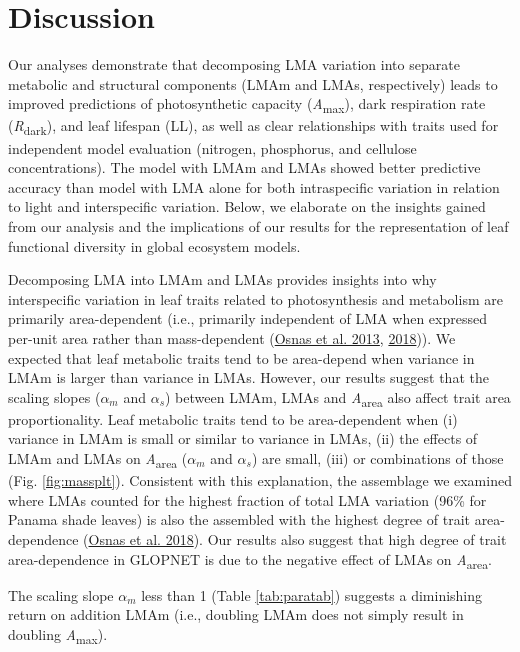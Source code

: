 \documentclass[
  12pt,
]{article}
\begin{document}
\hypertarget{discussion}{%
\section{Discussion}\label{discussion}}

Our analyses demonstrate that decomposing LMA variation into separate metabolic and structural components (LMAm and LMAs, respectively) leads to improved predictions of photosynthetic capacity (\emph{A}\textsubscript{max}), dark respiration rate (\emph{R}\textsubscript{dark}), and leaf lifespan (LL), as well as clear relationships with traits used for independent model evaluation (nitrogen, phosphorus, and cellulose concentrations).
The model with LMAm and LMAs showed better predictive accuracy than model with LMA alone for both intraspecific variation in relation to light and interspecific variation.
Below, we elaborate on the insights gained from our analysis and the implications of our results for the representation of leaf functional diversity in global ecosystem models.

Decomposing LMA into LMAm and LMAs provides insights into why interspecific variation in leaf traits related to photosynthesis and metabolism are primarily area-dependent (i.e., primarily independent of LMA when expressed per-unit area rather than mass-dependent (\protect\hyperlink{ref-Osnas2013}{Osnas et al. 2013}, \protect\hyperlink{ref-Osnas2018}{2018})).
We expected that leaf metabolic traits tend to be area-depend when variance in LMAm is larger than variance in LMAs.
However, our results suggest that the scaling slopes (\(\alpha_m\) and \(\alpha_s\)) between LMAm, LMAs and \emph{A}\textsubscript{area} also affect trait area proportionality.
Leaf metabolic traits tend to be area-dependent when (i) variance in LMAm is small or similar to variance in LMAs, (ii) the effects of LMAm and LMAs on \emph{A}\textsubscript{area} (\(\alpha_m\) and \(\alpha_s\)) are small, (iii) or combinations of those (Fig. \ref{fig:massplt}).
Consistent with this explanation, the assemblage we examined where LMAs counted for the highest fraction of total LMA variation (96\% for Panama shade leaves) is also the assembled with the highest degree of trait area-dependence (\protect\hyperlink{ref-Osnas2018}{Osnas et al. 2018}).
Our results also suggest that high degree of trait area-dependence in GLOPNET is due to the negative effect of LMAs on \emph{A}\textsubscript{area}.

The scaling slope \(\alpha_m\) less than 1 (Table \ref{tab:paratab}) suggests a diminishing return on addition LMAm (i.e., doubling LMAm does not simply result in doubling \emph{A}\textsubscript{max}).
\end{document}
